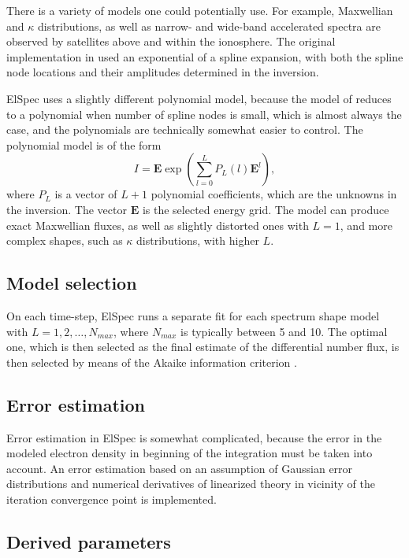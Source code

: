 \documentclass[12pt,a4paper]{report}
\begin{document}
There is a variety of models one could potentially use. For example, Maxwellian and $\kappa$ distributions, as well as narrow- and wide-band accelerated spectra  are observed by satellites above and within the ionosphere. The original implementation in \cite{dahlgren2011} used an exponential of a spline expansion, with both the spline node locations and their amplitudes determined in the inversion. 

ElSpec uses a slightly different polynomial model, because the model of \cite{dahlgren2011} reduces to a polynomial when number of spline nodes is small, which is almost always the case, and the polynomials are technically somewhat easier to control. The polynomial model is of the form
\begin{equation}
I = \bm{E}\exp{\left(\sum_{l=0}^L{P_L(l)\bm{E}^l}\right)},
\end{equation}
where $P_L$ is a vector of $L+1$ polynomial coefficients, which are the unknowns in the inversion. The vector $\bm{E}$ is the selected energy grid. The model can produce exact Maxwellian fluxes, as well as slightly distorted ones with $L=1$, and more complex shapes, such as $\kappa$ distributions, with higher $L$.

\subsection{Model selection}

On each time-step, ElSpec runs a separate fit for each spectrum shape model with $L=1,2,\ldots,N_{max}$, where $N_{max}$ is typically between 5 and 10. The optimal one, which is then selected as the final estimate of the differential number flux, is then selected by means of the Akaike information criterion \citep[e.g.][]{burnham2002}.


\subsection{Error estimation}

Error estimation in ElSpec is somewhat complicated, because the error in the modeled electron density in beginning of the integration must be taken into account. An error estimation based on an assumption of Gaussian error distributions and numerical derivatives of linearized theory in vicinity of the iteration convergence point is implemented. 

\subsection{Derived parameters}
\end{document}
